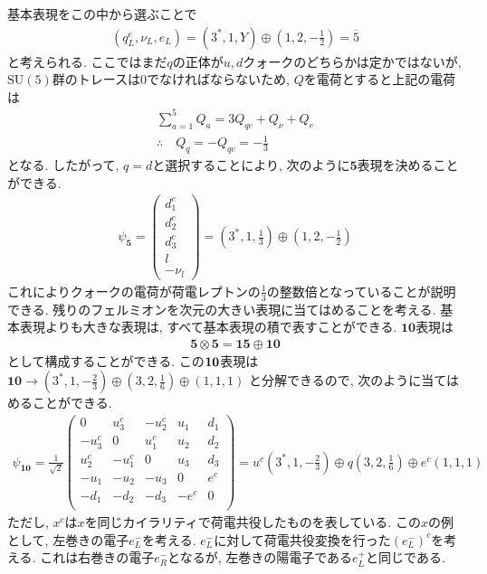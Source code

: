 基本表現をこの中から選ぶことで
\begin{align}
  (q_L^c, \nu_L, e_L) = (3^*, 1, Y)\oplus\left(1,2,-\frac{1}{2}\right) = \overline{5}
\end{align}
と考えられる.
ここではまだ$q$の正体が$u, d$クォークのどちらかは定かではないが, $\mathrm{SU}(5)$群のトレースは0でなければならないため, $Q$を電荷とすると上記の電荷は
\begin{align}
  \sum_{a=1}^5 Q_a = 3Q_{qc}+Q_\nu + Q_e\nonumber\\
  \therefore\quad Q_q = -Q_{qc} = -\frac{1}{3}\label{quantum_Q}
\end{align}
となる.
したがって, $q=d$と選択することにより, 次のように$\bm{5}$表現を決めることができる.
\begin{align}
 \psi_{\overline{\bm{5}}} =\begin{pmatrix}
    d_1 ^c \\
    d_2 ^c \\
    d_3 ^c \\
    l      \\
    -\nu_l
  \end{pmatrix}=\left({3}^*,1,\frac{1}{3}\right)\oplus \left(1,2,-\frac{1}{2}\right)\label{GUT-5rep}
\end{align}
これによりクォークの電荷が荷電レプトンの$\frac{1}{3}$の整数倍となっていることが説明できる.
残りのフェルミオンを次元の大きい表現に当てはめることを考える.
基本表現よりも大きな表現は, すべて基本表現の積で表すことができる.
${\bm{10}}$表現は
\begin{align}
  \bm{5}\otimes\bm{5} = \bm{15}\oplus\bm{10}\nonumber
\end{align}
として構成することができる.
この$\bf{10}$表現は$\bm{10}\rightarrow (3^*,1,-\frac{2}{3})\oplus(3,2,\frac{1}{6})\oplus(1,1,1)$
と分解できるので, 次のように当てはめることができる.
\begin{align}
\psi_{{\bm{10}}} = \frac{1}{\sqrt{2}}\begin{pmatrix}
         0 &  u_3^c & -u_2^c & u_1 & d_1 \\
    -u_3^c &      0 &  u_1^c & u_2 & d_2 \\
     u_2^c & -u_1^c &      0 & u_3 & d_3 \\
    -u_1   &   -u_2 &   -u_3 &   0 & e^c \\
      -d_1 &   -d_2 &   -d_3 &-e^c &   0 \\
    \end{pmatrix} = u^c\left(3^*,1,-\frac{2}{3}\right)\oplus q\left(3,2,\frac{1}{6}\right)\oplus e^c(1,1,1)\label{GUT-10rep}
\end{align}
ただし, $x^c$は$x$を同じカイラリティで荷電共役したものを表している.
この$x$の例として, 左巻きの電子$e^-_L$を考える.
$e^-_L$に対して荷電共役変換を行った$(e^-_L)^c$を考える.
これは右巻きの電子$e_R^-$となるが, 左巻きの陽電子である$e_L^+$と同じである.
